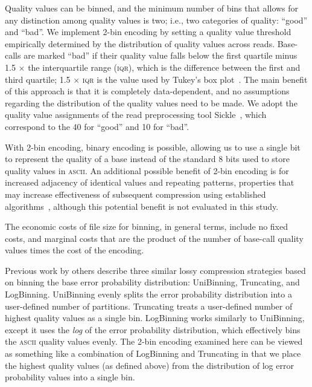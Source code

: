 \documentclass{bmcart}
\begin{document}
Quality values can be binned, and the minimum number of bins that
allows for any distinction among quality values is two; i.e., two
categories of quality: ``good'' and ``bad''. We implement 2-bin
encoding by setting a quality value threshold empirically determined
by the distribution of quality values across reads. Base-calls are
marked ``bad'' if their quality value falls below the first quartile
minus 1.5 $\times$ the interquartile range (\textsc{iqr}), which is
the difference between the first and third quartile; 1.5 $\times$
\textsc{iqr} is the value used by Tukey's box
plot~\cite{mcgill1978variations}. The main benefit of this approach is
that it is completely data-dependent, and no assumptions regarding the
distribution of the quality values need to be made. We adopt the
quality value assignments of the read preprocessing tool
Sickle~\cite{sickle}, which correspond to the 40 for ``good'' and 10
for ``bad''.

With 2-bin encoding, binary encoding is possible, allowing us to use a
single bit to represent the quality of a base instead of the standard
8 bits used to store quality values in \textsc{ascii}. An additional
possible benefit of 2-bin encoding is for increased adjacency of
identical values and repeating patterns, properties that may increase
effectiveness of subsequent compression using established
algorithms~\cite{HUFFMAN:1952nr,Ziv77auniversal,
  DBLP:journals/tit/ZivL78}, although this potential benefit is not
evaluated in this study.

The economic costs of file size for binning, in general terms, include
no fixed costs, and marginal costs that are the product of the number
of base-call quality values times the cost of the encoding.

Previous work by others \cite{Wan:2012kq} describe three similar lossy
compression strategies based on binning the base error probability
distribution: UniBinning, Truncating, and LogBinning. UniBinning
evenly splits the error probability distribution into a user-defined
number of partitions. Truncating treats a user-defined number of
highest quality values as a single bin. LogBinning works similarly to
UniBinning, except it uses the \emph{log} of the error probability
distribution, which effectively bins the \textsc{ascii} quality values
evenly. The 2-bin encoding examined here can be viewed as something
like a combination of LogBinning and Truncating in that we place the
highest quality values (as defined above) from the distribution of log
error probability values into a single bin.
\end{document}
